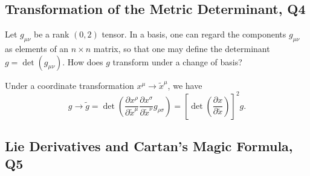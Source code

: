 \subsection{Transformation of the Metric Determinant, Q4}

Let $g_{\mu\nu}$ be a rank $(0,2)$ tensor. In a basis, one can regard the components $g_{\mu\nu}$ as elements of an $n\times n$ matrix, so that one may define the determinant $g = \det(g_{\mu\nu})$. How does $g$ transform under a change of basis?
\begin{solution}
    Under a coordinate transformation $x^\mu \to \tilde{x}^\mu$, we have
    \begin{equation}
        g \to \tilde{g} = \det\left(\frac{\partial x^\rho}{\partial \tilde{x}^\mu}\frac{\partial x^\sigma}{\partial \tilde{x}^\nu}g_{\rho\sigma}\right) = \left[\det\left(\frac{\partial x}{\partial \tilde{x}}\right)\right]^2g.
    \end{equation}
\end{solution}

\subsection{Lie Derivatives and Cartan's Magic Formula, Q5}

